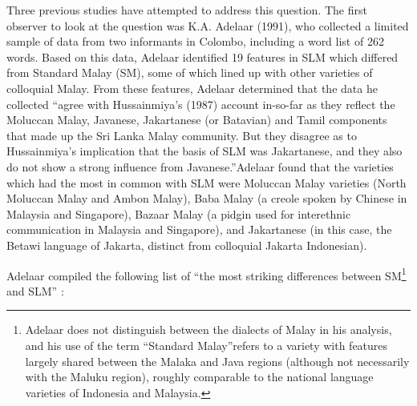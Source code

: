 Three previous studies have attempted to address this question. The first observer to look at the question was K.A. Adelaar (1991), who collected a limited sample of data from two informants in Colombo, including a word list of 262 words. Based on this data, Adelaar identified 19 features in SLM which differed from Standard Malay (SM), some of which lined up with other varieties of colloquial Malay. From these features, Adelaar determined that the data he collected ``agree with Hussainmiya's (1987) account in-so-far as they reflect the Moluccan Malay, Javanese, Jakartanese (or Batavian) and Tamil components that made up the Sri Lanka Malay community. But they disagree as to Hussainmiya's implication that the basis of SLM was Jakartanese, and they also do not show a strong influence from Javanese.''Adelaar found that the varieties which had the most in common with SLM were Moluccan Malay varieties (North Moluccan Malay and Ambon Malay), Baba Malay (a creole spoken by Chinese in Malaysia and Singapore), Bazaar Malay (a pidgin used for interethnic communication in Malaysia and Singapore), and Jakartanese (in this case, the Betawi language of Jakarta, distinct from colloquial Jakarta Indonesian). 

Adelaar compiled the following list of ``the most striking differences between SM\footnote{Adelaar
 does not distinguish between the dialects of Malay in his analysis, and his use of the term ``Standard Malay''refers to a variety with features largely shared between the Malaka and Java regions (although not necessarily with the Maluku region), roughly comparable to the national language varieties of Indonesia and Malaysia. 
} 
and SLM'' \citep[25-26]{Adelaar1991}:

